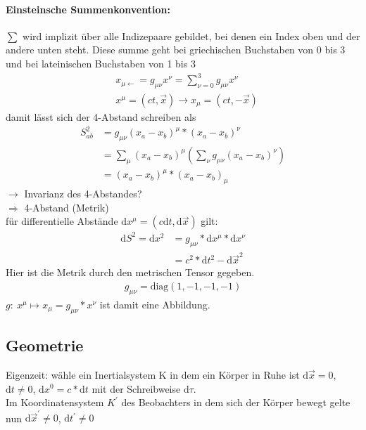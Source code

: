 \documentclass[a4paper]{article}
\begin{document}
\paragraph{Einsteinsche Summenkonvention:} 
$\sum$ wird implizit über alle Indizepaare gebildet, bei denen ein Index oben
und der andere unten steht. Diese summe geht bei griechischen Buchstaben von 0
bis 3 und bei lateinischen Buchstaben von 1 bis 3
\begin{align}
&x_{\mu \leftarrow}=g_{\mu \nu}x^{\nu}=\sum_{\nu=0}^3g_{\mu \nu}x^{\nu}\\
&x^{\mu}=(ct,\vec{x}) \rightarrow x_{\mu}=(ct,-\vec{x})
\end{align}
damit lässt sich der 4-Abstand schreiben als
\begin{align}
S^2_{ab}&=g_{\mu \nu}(x_a-x_b)^{\mu}*(x_a-x_b)^{\nu}\\
&=\sum_{\mu}(x_a-x_b)^{\mu}\left(\sum_{\nu}g_{\mu \nu}(x_a-x_b)^{\nu}\right)\\
&=(x_a-x_b)^{\mu}*(x_a-x_b)_{\mu}
\end{align}
$\rightarrow$ Invarianz des 4-Abstandes?\\
$\Rightarrow$ 4-Abstand (Metrik)\\
für differentielle Abstände $\mathrm{d}x^{\mu}=(c\mathrm{d}t,\mathrm{d}\vec{x})$ gilt:
\begin{align}
\mathrm{d}S^2=\mathrm{d}x^2&=g_{\mu \nu}*\mathrm{d}x^{\mu}*\mathrm{d}x^{\nu}\\
&=c^2*\mathrm{d}t^2-\mathrm{d}\vec{x}^2
\end{align}
Hier ist die Metrik durch den metrischen Tensor gegeben.
\begin{align}
g_{\mu \nu}=\text{diag}(1,-1,-1,-1)
\end{align}
$g:\ x^{\mu} \mapsto x_{\mu}=g_{\mu
\nu}*x^{\nu}$ ist damit eine Abbildung.\\

\subsection{Geometrie}
Eigenzeit: wähle ein Inertialsystem K in dem ein Körper in Ruhe ist
$\mathrm{d}\vec{x}=0$, $\mathrm{d}t\neq0$, $\mathrm{d}x^0=c*\mathrm{d}t$ mit der Schreibweise $\mathrm{d}\tau$.\\
Im Koordinatensystem $K^{'}$ des Beobachters in dem sich der Körper bewegt gelte
nun $\mathrm{d}\vec{x}^{'}\neq0$, $\mathrm{d}t^{'}\neq0$\\
\end{document}
